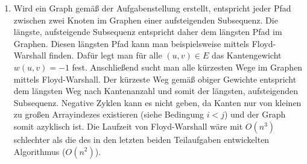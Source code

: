 \documentclass[11pt,a4paper]{article}
\begin{document}
\begin{loesung}
\begin{enumerate}
        \item Wird ein Graph gemäß der Aufgabenstellung erstellt, entspricht jeder Pfad zwischen zwei Knoten im Graphen einer aufsteigenden Subsequenz.
        Die längste, aufsteigende Subsequenz entspricht daher dem längsten Pfad im Graphen.
        Diesen längsten Pfad kann man beispielsweise mittels Floyd-Warshall finden.
        Dafür legt man für alle $(u, v) \in E$ das Kantengewicht $w(u, v) = -1$ fest.
        Anschließend sucht man alle kürzesten Wege im Graphen mittels Floyd-Warshall. Der kürzeste Weg gemäß obiger Gewichte entspricht dem längsten Weg nach Kantenanzahl und somit der längsten, aufsteigenden Subsequenz.
        Negative Zyklen kann es nicht geben, da Kanten nur von kleinen zu großen Arrayindezes existieren (siehe Bedingung $i < j$) und der Graph somit azyklisch ist.
        Die Laufzeit von Floyd-Warshall wäre mit $O(n^3)$ schlechter als die des in den letzten beiden Teilaufgaben entwickelten Algorithmus ($O(n^2)$).
    \end{enumerate}
\end{loesung}
\end{document}
